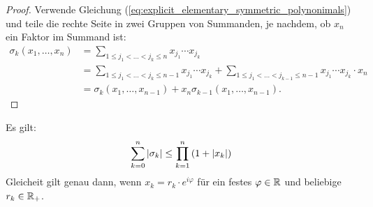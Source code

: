 \begin{proof}
    Verwende Gleichung (\ref{eq:explicit_elementary_symmetric_polynonimals})
    und teile die rechte Seite in zwei Gruppen von Summanden, je nachdem, ob
    $x_n$ ein Faktor im Summand ist:
    \begin{equation*}
        \begin{split}
            \sigma_k (x_1, \dots, x_{n})
            &= \sum_{1 \leq j_1 < \dots < j_k \leq n} x_{j_1} \cdots x_{j_k}\\
            &= \sum_{1 \leq j_1 < \dots < j_k \leq n-1} x_{j_1} \cdots x_{j_k}
            + \sum_{1 \leq j_1 < \dots < j_{k-1} \leq n-1} x_{j_1} \cdots x_{j_k} \cdot x_{n}\\
            &= \sigma_k (x_1, \dots, x_{n-1}) + x_{n} \sigma_{k-1} (x_1, \dots, x_{n-1}).
        \end{split}
    \end{equation*}
\end{proof}

\begin{lemma}
    \label{lemma:elementary_symmetric_polynomials_inequality}
    Es gilt:
    \begin{equation}
        \label{eq:elementary_symmetric_polynomials_inequality}
        \sum_{k=0}^{n} \left\lvert \sigma_{k} \right\rvert \leq \prod_{k=1}^{n} \left( 1 + \left\lvert x_k \right\rvert \right)
    \end{equation}
    Gleicheit gilt genau dann, wenn $x_k = r_k \cdot e^{i\varphi}$ für ein festes $\varphi \in \mathbb{R}$ und beliebige $r_k \in \mathbb{R}_+$.
\end{lemma}

